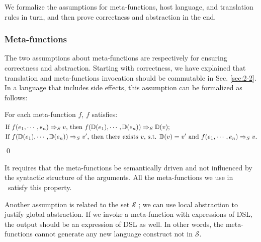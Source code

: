 We formalize the assumptions for meta-functions, host language, and translation rules in turn, and then prove correctness and abstraction in the end.

\subsubsection{Meta-functions}

The two assumptions about meta-functions are respectively for ensuring correctness and abstraction. Starting with correctness, we have explained that translation and meta-functions invocation should be commutable in Sec. \ref{sec:2-2}. In a language that includes side effects, this assumption can be formalized as follows:
\begin{assumption}\label{asm:meta}
For each meta-function $f$, $f$ satisfies: 
\begin{align*}
 & \text{If $f(e_1,\cdots,e_n) =>_S v$, then $f(\mathbb{D}(e_1),\cdots,\mathbb{D}(e_n)) =>_S \mathbb{D}(v)$;} \\
 & \text{If $f(\mathbb{D}(e_1),\cdots,\mathbb{D}(e_n)) =>_S v'$, then there exists $v$, s.t. $\mathbb{D}(v)=v'$ and $f(e_1,\cdots,e_n) =>_S v$.}
\end{align*}
\qed
\end{assumption}
It requires that the meta-functions be semantically driven and not influenced by the syntactic structure of the arguments.
All the meta-functions we use in \Func\ satisfy this property.


Another assumption is related to the set $\mathcal{S}$ ;
 we can use local abstraction to justify global abstraction.
If we invoke a meta-function with expressions of DSL, the output should be an expression of DSL as well.
In other words, the meta-functions cannot generate any new language construct not in $\mathcal{S}$.

